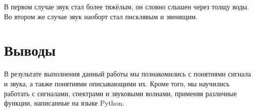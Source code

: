 \documentclass[a4paper,12pt]{report}
\begin{document}
    В первом случае звук стал более тяжёлым, он словно слышен через толщу воды. Во втором же случае звук наоборт стал писклявым и звенящим.

\chapter{Выводы}
    В результате выполнения данный работы мы познакомились с понятиями сигнала и звука, а также понятиями описывающими их. Кроме того, мы научились работать с сигналами, спектрами и звуковыми волнами, применяя различные функции, написанные на языке Python.
\end{document}
